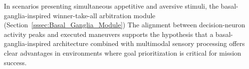 %

In scenarios presenting simultaneous appetitive and aversive stimuli, the basal-ganglia-inspired winner-take-all arbitration module (Section~\ref{sssec:Basal_Ganglia_Module})  The alignment between decision-neuron activity peaks and executed maneuvers supports the hypothesis that a basal-ganglia-inspired architecture combined with multimodal sensory processing offers clear advantages in environments where goal prioritization is critical for mission success.
